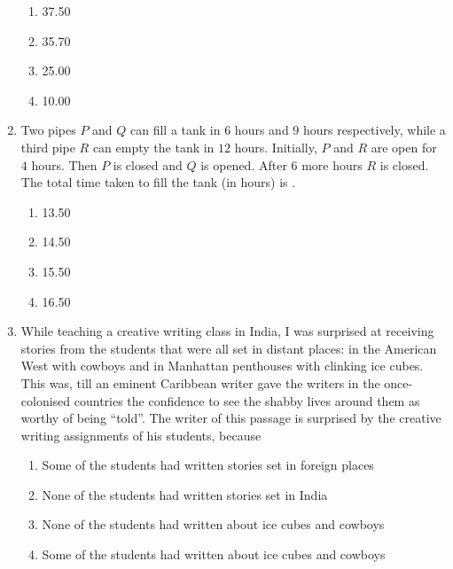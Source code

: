 \documentclass[journal,12pt,onecolumn]{IEEEtran}
\begin{document}
\begin{enumerate}[label=\arabic*)]
\begin{enumerate}[label=\alph*)]
\item 37.50
\item 35.70
\item 25.00
\item 10.00
\end{enumerate}

\vspace{0.5cm}

\item Two pipes $P$ and $Q$ can fill a tank in $6$ hours and $9$ hours respectively, while a third pipe $R$ can empty the tank in $12$ hours. Initially, $P$ and $R$ are open for $4$ hours. Then $P$ is closed and $Q$ is opened. After $6$ more hours $R$ is closed. The total time taken to fill the tank (in hours) is \underline{\hspace{2cm}}.
\vspace{0.2cm}
\hfill{} \\

\begin{enumerate}[label=\alph*)]
\item 13.50
\item 14.50
\item 15.50
\item 16.50
\end{enumerate}

\vspace{0.5cm}

\item While teaching a creative writing class in India, I was surprised at receiving stories from the students that were all set in distant places: in the American West with cowboys and in Manhattan penthouses with clinking ice cubes. This was, till an eminent Caribbean writer gave the writers in the once-colonised countries the confidence to see the shabby lives around them as worthy of being ``told''. The writer of this passage is surprised by the creative writing assignments of his students, because
\vspace{0.2cm}
\hfill{} \\

\begin{enumerate}[label=\alph*)]
\item Some of the students had written stories set in foreign places
\item None of the students had written stories set in India
\item None of the students had written about ice cubes and cowboys
\item Some of the students had written about ice cubes and cowboys
\end{enumerate}


\end{enumerate}
\end{document}
